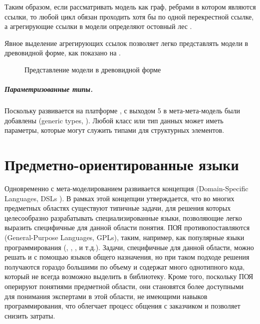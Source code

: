 Таким образом, если рассматривать модель как граф, ребрами в котором являются ссылки, то любой цикл обязан проходить хотя бы по одной перекрестной ссылке, а агрегирующие ссылки в модели определяют остовный лес \cite{???}.

Явное выделение агрегирующих ссылок позволяет легко представлять модели в древовидной форме, как показано на .

\begin{figure}[htbp]
\caption{Представление модели в древовидной форме}\label{ModelTree}
\end{figure}

\paragraph*{Параметризованные типы.} Поскольку  развивается на платформе , с выходом  5 в мета-мета-модель были добавлены  (generic types, \cite{Generics, GJ}). Любой класс или тип данных может иметь параметры, которые могут служить типами для структурных элементов.

\chapter{Предметно-ориентированные языки}

Одновременно с мета-моделированием развивается концепция  (Domain-Specific Languages, DSLs \cite{DSLs}). В рамках этой концепции утверждается, что во многих предметных областях существуют типичные задачи, для решения которых целесообразно разрабатывать специализированные языки, позволяющие легко выразить специфичные для данной области понятия. ПОЯ противопоставляются  (General-Purpose Languages, GPLs), таким, например, как популярные языки программирования (, , ,  и т.д.). Задачи, специфичные для данной области, можно решать и с помощью языков общего назначения, но при таком подходе решения получаются гораздо большими по объему и содержат много однотипного кода, который не всегда возможно выделить в библиотеку. Кроме того, поскольку ПОЯ оперируют понятиями предметной области, они становятся более доступными для понимания экспертами в этой области, не имеющими навыков программирования, что облегчает процесс общения с заказчиком и позволяет снизить затраты.

